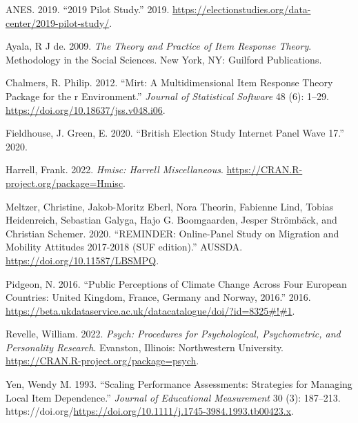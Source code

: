\documentclass[11pt,halfline,a4paper,]{ouparticle}
\newlength{\cslhangindent}
\newenvironment{CSLReferences}[2] %
 {%
  \setlength{\parindent}{0pt}
  \ifodd #1 \everypar{\setlength{\hangindent}{\cslhangindent}}\ignorespaces\fi
  \ifnum #2 > 0
  \setlength{\parskip}{#2\baselineskip}
  \fi
 }%
 {}
\begin{document}
\hypertarget{refs}{}
\begin{CSLReferences}{1}{0}
\leavevmode{}%
ANES. 2019. {``2019 Pilot Study.''} 2019.
\url{https://electionstudies.org/data-center/2019-pilot-study/}.

\leavevmode{}%
Ayala, R J de. 2009. \emph{The Theory and Practice of Item Response
Theory}. Methodology in the Social Sciences. New York, NY: Guilford
Publications.

\leavevmode{}%
Chalmers, R. Philip. 2012. {``Mirt: A Multidimensional Item Response
Theory Package for the r Environment.''} \emph{Journal of Statistical
Software} 48 (6): 1--29. \url{https://doi.org/10.18637/jss.v048.i06}.

\leavevmode{}%
Fieldhouse, J. Green, E. 2020. {``British Election Study Internet Panel
Wave 17.''} 2020.

\leavevmode{}%
Harrell, Frank. 2022. \emph{Hmisc: Harrell Miscellaneous}.
\url{https://CRAN.R-project.org/package=Hmisc}.

\leavevmode{}%
Meltzer, Christine, Jakob-Moritz Eberl, Nora Theorin, Fabienne Lind,
Tobias Heidenreich, Sebastian Galyga, Hajo G. Boomgaarden, Jesper
Strömbäck, and Christian Schemer. 2020. {``{REMINDER: Online-Panel Study
on Migration and Mobility Attitudes 2017-2018 (SUF edition)}.''} AUSSDA.
\url{https://doi.org/10.11587/LBSMPQ}.

\leavevmode{}%
Pidgeon, N. 2016. {``Public Perceptions of Climate Change Across Four
European Countries: United Kingdom, France, Germany and Norway, 2016.''}
2016.
\url{https://beta.ukdataservice.ac.uk/datacatalogue/doi/?id=8325\#!\#1}.

\leavevmode{}%
Revelle, William. 2022. \emph{Psych: Procedures for Psychological,
Psychometric, and Personality Research}. Evanston, Illinois:
Northwestern University. \url{https://CRAN.R-project.org/package=psych}.

\leavevmode{}%
Yen, Wendy M. 1993. {``Scaling Performance Assessments: Strategies for
Managing Local Item Dependence.''} \emph{Journal of Educational
Measurement} 30 (3): 187--213.
https://doi.org/\url{https://doi.org/10.1111/j.1745-3984.1993.tb00423.x}.

\end{CSLReferences}
\end{document}
